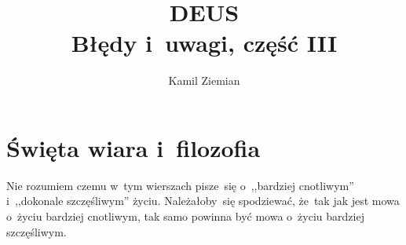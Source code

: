 \documentclass[a4paper,11pt]{article}
\title{DEUS \\
  {\Large Błędy i~uwagi, część III}}
\author{Kamil Ziemian}
\begin{document}





\maketitle  %





\section{Święta wiara i~filozofia}

\vspace{\spaceTwo}







{}

\vspace{0em}



\vspace{0em}


 Nie rozumiem czemu w~tym wierszach pisze~się o~,,bardziej
cnotliwym'' i~,,dokonale szczęśliwym'' życiu. Należałoby~się spodziewać, że~tak
jak jest mowa o~życiu bardziej cnotliwym, tak samo powinna być mowa o~życiu
bardziej szczęśliwym.

\vspace{\spaceFour}
\end{document}
